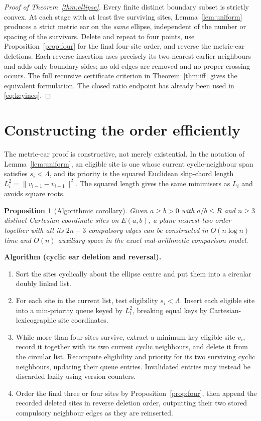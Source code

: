 \documentclass[11pt,a4paper]{article}
\newtheorem{proposition}[theorem]{Proposition}
\theoremstyle{definition}\newtheorem{definition}[theorem]{Definition}
\theoremstyle{remark}\newtheorem{remark}[theorem]{Remark}
\newcommand{\Rbound}{R}
\newcommand{\Ell}{E(a,b)}
\newcommand{\dist}[2]{\lVert #1-#2\rVert}
\begin{document}
\begin{proof}[Proof of Theorem~\ref{thm:ellipse}]
Every finite distinct boundary subset is strictly convex. At each stage with at least five surviving sites, Lemma~\ref{lem:uniform} produces a strict metric ear on the \emph{same} ellipse, independent of the number or spacing of the survivors. Delete and repeat to four points, use Proposition~\ref{prop:four} for the final four-site order, and reverse the metric-ear deletions. Each reverse insertion uses precisely its two nearest earlier neighbours and adds only boundary sides; no old edges are removed and no proper crossing occurs. The full recursive certificate criterion in Theorem~\ref{thm:iff} gives the equivalent formulation. The closed ratio endpoint has already been used in \eqref{eq:keyineq}.
\end{proof}


\section{Constructing the order efficiently}\label{sec:algorithm}
The metric-ear proof is constructive, not merely existential. In the notation of Lemma~\ref{lem:uniform}, an eligible site is one whose current cyclic-neighbour span satisfies $s_i<\Lambda$, and its priority is the squared Euclidean skip-chord length $L_i^2=\dist{v_{i-1}}{v_{i+1}}^2$. The squared length gives the same minimisers as $L_i$ and avoids square roots.

\begin{proposition}[Algorithmic corollary]\label{prop:algorithm}
Given $a\ge b>0$ with $a/b\le\Rbound$ and $n\ge3$ distinct Cartesian-coordinate sites on $\Ell$, a plane nearest-two order together with all its $2n-3$ compulsory edges can be constructed in $O(n\log n)$ time and $O(n)$ auxiliary space in the exact real-arithmetic comparison model.
\end{proposition}

\noindent\textbf{Algorithm (cyclic ear deletion and reversal).}
\begin{enumerate}[leftmargin=*,itemsep=1pt,topsep=3pt]
\item Sort the sites cyclically about the ellipse centre and put them into a circular doubly linked list.
\item For each site in the current list, test eligibility $s_i<\Lambda$. Insert each eligible site into a min-priority queue keyed by $L_i^2$, breaking equal keys by Cartesian-lexicographic site coordinates.
\item While more than four sites survive, extract a minimum-key eligible site $v_i$, record it together with its two current cyclic neighbours, and delete it from the circular list. Recompute eligibility and priority for its two surviving cyclic neighbours, updating their queue entries. Invalidated entries may instead be discarded lazily using version counters.
\item Order the final three or four sites by Proposition~\ref{prop:four}, then append the recorded deleted sites in reverse deletion order, outputting their two stored compulsory neighbour edges as they are reinserted.
\end{enumerate}
\end{document}

